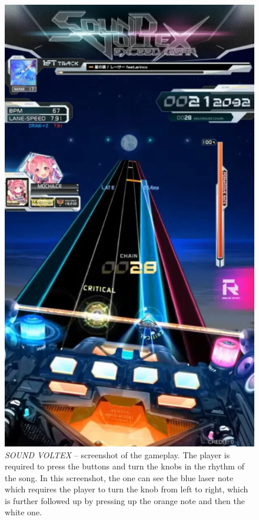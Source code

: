 \begin{figure}[h]
    \centering\includegraphics[scale=0.6]{obrazki/sdvx.png}
    \caption{\textit{SOUND VOLTEX} -- screenshot of the gameplay. The player is required to press the buttons and turn the knobs in the rhythm of the song. In this screenshot, the one can see the blue laser note which requires the player to turn the knob from left to right, which is further followed up by pressing up the orange note and then the white one. \cite{sdvx}}
    \label{fig:sdvx2}
\end{figure}


